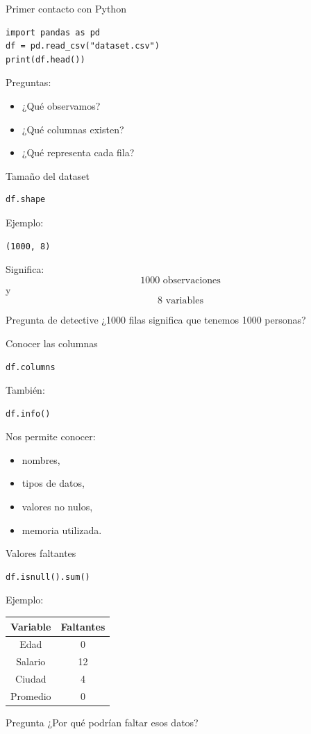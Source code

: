 \documentclass[aspectratio=169,11pt]{beamer}
\begin{document}
\begin{frame}[fragile]{Primer contacto con Python}
\begin{lstlisting}
import pandas as pd
df = pd.read_csv("dataset.csv")
print(df.head())
\end{lstlisting}
Preguntas:
\begin{itemize}
    \item ¿Qué observamos?
    \item ¿Qué columnas existen?
    \item ¿Qué representa cada fila?
\end{itemize}
\end{frame}
\begin{frame}[fragile]{Tamaño del dataset}
\begin{lstlisting}
df.shape
\end{lstlisting}
Ejemplo:
\begin{lstlisting}
(1000, 8)
\end{lstlisting}
Significa:
\[
1000 \text{ observaciones}
\]
y
\[
8 \text{ variables}
\]
\begin{alertblock}{Pregunta de detective}
¿1000 filas significa que tenemos 1000 personas?
\end{alertblock}
\end{frame}
\begin{frame}[fragile]{Conocer las columnas}
\begin{lstlisting}
df.columns
\end{lstlisting}
También:
\begin{lstlisting}
df.info()
\end{lstlisting}
Nos permite conocer:
\begin{itemize}
    \item nombres,
    \item tipos de datos,
    \item valores no nulos,
    \item memoria utilizada.
\end{itemize}
\end{frame}
\begin{frame}[fragile]{Valores faltantes}
\begin{lstlisting}
df.isnull().sum()
\end{lstlisting}
Ejemplo:
\begin{tabular}{cc}
\toprule
Variable & Faltantes\\
\midrule
Edad & 0\\
Salario & 12\\
Ciudad & 4\\
Promedio & 0\\
\bottomrule
\end{tabular}
\begin{alertblock}{Pregunta}
¿Por qué podrían faltar esos datos?
\end{alertblock}
\end{frame}
\end{document}
